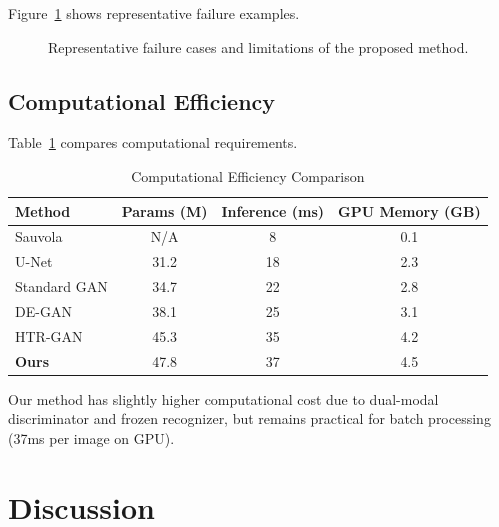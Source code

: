 \documentclass[journal]{IEEEtran}
\begin{document}
Figure~\ref{fig:failure_cases} shows representative failure examples.

\begin{figure}[!t]
\centering
\caption{Representative failure cases and limitations of the proposed method.}
\label{fig:failure_cases}
\end{figure}

\subsection{Computational Efficiency}

Table~\ref{table_efficiency} compares computational requirements.

\begin{table}[!t]
\renewcommand{\arraystretch}{1.3}
\caption{Computational Efficiency Comparison}
\label{table_efficiency}
\centering
\begin{tabular}{|l|c|c|c|}
\hline
\textbf{Method} & \textbf{Params (M)} & \textbf{Inference (ms)} & \textbf{GPU Memory (GB)} \\
\hline
Sauvola & N/A & 8 & 0.1 \\
U-Net & 31.2 & 18 & 2.3 \\
Standard GAN & 34.7 & 22 & 2.8 \\
DE-GAN & 38.1 & 25 & 3.1 \\
HTR-GAN & 45.3 & 35 & 4.2 \\
\textbf{Ours} & 47.8 & 37 & 4.5 \\
\hline
\end{tabular}
\end{table}

Our method has slightly higher computational cost due to dual-modal discriminator and frozen recognizer, but remains practical for batch processing (37ms per image on GPU).

\section{Discussion}
\end{document}
